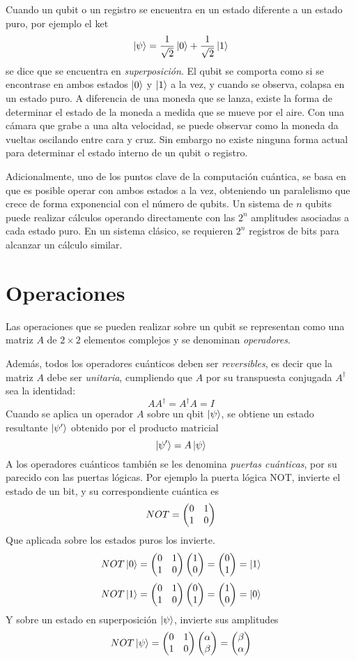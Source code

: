 Cuando un qubit o un registro se encuentra en un estado diferente a un estado 
puro, por ejemplo el ket
$$\ket{\psi} = \frac{1}{\sqrt{2}} \ket{0} + \frac{1}{\sqrt{2}} \ket{1} $$
se dice que se encuentra en \textit{superposición}. El qubit se comporta como si 
se encontrase en ambos estados $\ket{0}$ y $\ket{1}$ a la vez, y cuando se 
observa, colapsa en un estado puro. A diferencia de una moneda que se lanza, 
existe la forma de determinar el estado de la moneda a medida que se mueve por 
el aire. Con una cámara que grabe a una alta velocidad, se puede observar como 
la moneda da vueltas oscilando entre cara y cruz. Sin embargo no existe ninguna 
forma actual para determinar el estado interno de un qubit o registro.

Adicionalmente, uno de los puntos clave de la computación cuántica, se basa en 
que es posible operar con ambos estados a la vez, obteniendo un paralelismo que 
crece de forma exponencial con el número de qubits. Un sistema de $n$ qubits 
puede realizar cálculos operando directamente con las $2^n$ amplitudes asociadas 
a cada estado puro. En un sistema clásico, se requieren $2^n$ registros de bits 
para alcanzar un cálculo similar.

\section{Operaciones}

Las operaciones que se pueden realizar sobre un qubit se representan como una 
matriz $A$ de $2 \times 2$ elementos complejos y se denominan 
\textit{operadores}.

Además, todos los operadores cuánticos deben ser \textit{reversibles}, es decir 
que la matriz $A$ debe ser \textit{unitaria}, cumpliendo que $A$ por su 
transpuesta conjugada $A^\dagger$ sea la identidad:
$$ A A^\dagger = A^\dagger A = I$$
%
Cuando se aplica un operador $A$ sobre un qbit $\ket{\psi}$, se obtiene un 
estado resultante $\ket{\psi'}$ obtenido por el producto matricial
$$ \ket{\psi'} = A\ket{\psi} $$
%
A los operadores cuánticos también se les denomina \textit{puertas cuánticas}, 
por su parecido con las puertas lógicas. Por ejemplo la puerta lógica NOT, 
invierte el estado de un bit, y su correspondiente cuántica es
%
$$ NOT = \begin{pmatrix} 0 & 1\\1 & 0 \end{pmatrix} $$
%
Que aplicada sobre los estados puros los invierte.
%
$$ NOT\ket{0} = \begin{pmatrix} 0 & 1\\1 & 0 \end{pmatrix} \begin{pmatrix} 1\\0 \end{pmatrix} = \begin{pmatrix} 0\\1 \end{pmatrix} = \ket{1} $$
$$ NOT\ket{1} = \begin{pmatrix} 0 & 1\\1 & 0 \end{pmatrix} \begin{pmatrix} 0\\1 \end{pmatrix} = \begin{pmatrix} 1\\0 \end{pmatrix} = \ket{0} $$
%
Y sobre un estado en superposición $\ket{\psi}$, invierte sus amplitudes
%
$$ NOT\ket{\psi} = \begin{pmatrix} 0 & 1\\1 & 0 \end{pmatrix} \begin{pmatrix} \alpha \\ \beta \end{pmatrix} =
\begin{pmatrix} \beta\\\alpha \end{pmatrix} $$
%

